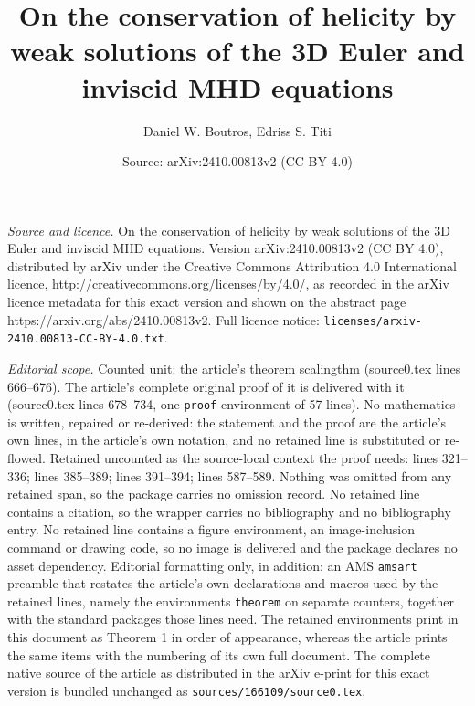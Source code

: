 \documentclass[10pt,a4paper]{amsart}
\title{On the conservation of helicity by weak solutions of the 3D Euler and inviscid MHD equations}
\author{Daniel W. Boutros, Edriss S. Titi}
\date{Source: arXiv:2410.00813v2 (CC BY 4.0)}
\begin{document}
\maketitle

\noindent\emph{Source and licence.} On the conservation of helicity by weak solutions of the 3D Euler and inviscid MHD equations. Version arXiv:2410.00813v2 (CC BY 4.0), distributed by arXiv under the Creative Commons Attribution 4.0 International licence, http://creativecommons.org/licenses/by/4.0/, as recorded in the arXiv licence metadata for this exact version and shown on the abstract page https://arxiv.org/abs/2410.00813v2. Full licence notice: \texttt{licenses/arxiv-2410.00813-CC-BY-4.0.txt}.\par\smallskip

\noindent\textit{Editorial scope.} Counted unit: the article's theorem scalingthm (source0.tex lines 666--676). The article's complete original proof of it is delivered with it (source0.tex lines 678--734, one \texttt{proof} environment of 57 lines). No mathematics is written, repaired or re-derived: the statement and the proof are the article's own lines, in the article's own notation, and no retained line is substituted or re-flowed.  Retained uncounted as the source-local context the proof needs: lines 321--336; lines 385--389; lines 391--394; lines 587--589.  Nothing was omitted from any retained span, so the package carries no omission record.  No retained line contains a citation, so the wrapper carries no bibliography and no bibliography entry.  No retained line contains a figure environment, an image-inclusion command or drawing code, so no image is delivered and the package declares no asset dependency.  Editorial formatting only, in addition: an AMS \texttt{amsart} preamble that restates the article's own declarations and macros used by the retained lines, namely the environments \texttt{theorem} on separate counters, together with the standard packages those lines need.  The retained environments print in this document as Theorem 1 in order of appearance, whereas the article prints the same items with the numbering of its own full document.  The complete native source of the article as distributed in the arXiv e-print for this exact version is bundled unchanged as \texttt{sources/166109/source0.tex}.
\end{document}
